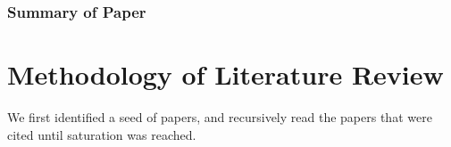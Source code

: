 \documentclass{article}
\begin{document}
\subsubsection{Summary of Paper}

\section{Methodology of Literature Review}
We first identified a seed of papers, and recursively read the papers that were cited until saturation was reached. 

\nocite{*}
\printbibliography
\end{document}
